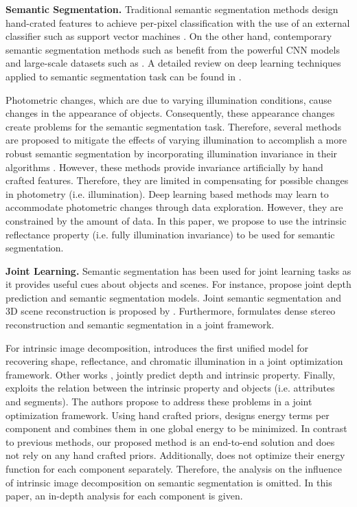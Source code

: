 \documentclass[runningheads]{llncs}
\begin{document}
\noindent \textbf{Semantic Segmentation.}
Traditional semantic segmentation methods design hand-crated features to achieve per-pixel classification with the use of an external classifier such as support vector machines \cite{fulkerson,csurka,shotton}. On the other hand, contemporary semantic segmentation methods such as \cite{segnet,fcnn,deeplab} benefit from the powerful CNN models and large-scale datasets such as \cite{pascal,cityscape}. A detailed review on deep learning techniques applied to semantic segmentation task can be found in \cite{garcia}. 

Photometric changes, which are due to varying illumination conditions, cause changes in the appearance of objects. Consequently, these appearance changes create problems for the semantic segmentation task. Therefore, several methods are proposed to mitigate the effects of varying illumination to accomplish a more robust semantic segmentation by incorporating illumination invariance in their algorithms \cite{upcroft,wang,suh,ramakrishnan}. However, these methods provide invariance artificially by hand crafted features. Therefore, they are limited in compensating for possible changes in photometry (i.e. illumination). Deep learning based methods may learn to accommodate photometric changes through data exploration. However, they are constrained by the amount of data. In this paper, we propose to use the intrinsic reflectance property (i.e. fully illumination invariance) to be used for semantic segmentation.

\noindent \textbf{Joint Learning.} Semantic segmentation has been used for joint learning tasks as it provides useful cues about objects and scenes. For instance, \cite{jafari,eigen,mousavian} propose joint depth prediction and semantic segmentation models. Joint semantic segmentation and 3D scene reconstruction is proposed by \cite{kundu}. Furthermore, \cite{ladicky} formulates dense stereo reconstruction and semantic segmentation in a joint framework.

For intrinsic image decomposition, \cite{barron} introduces the first unified model for recovering shape, reflectance, and chromatic illumination in a joint optimization framework. Other works \cite{kim2,shelhamer}, jointly predict depth and intrinsic property. Finally, \cite{vineet} exploits the relation between the intrinsic property and objects (i.e. attributes and segments). The authors propose to address these problems in a joint optimization framework. Using hand crafted priors, \cite{vineet} designs energy terms per component and combines them in one global energy to be minimized. In contrast to previous methods, our proposed method is an end-to-end solution and does not rely on any hand crafted priors. Additionally, \cite{vineet} does not optimize their energy function for each component separately. Therefore, the analysis on the influence of intrinsic image decomposition on semantic segmentation is omitted. In this paper, an in-depth analysis for each component is given.
\end{document}
